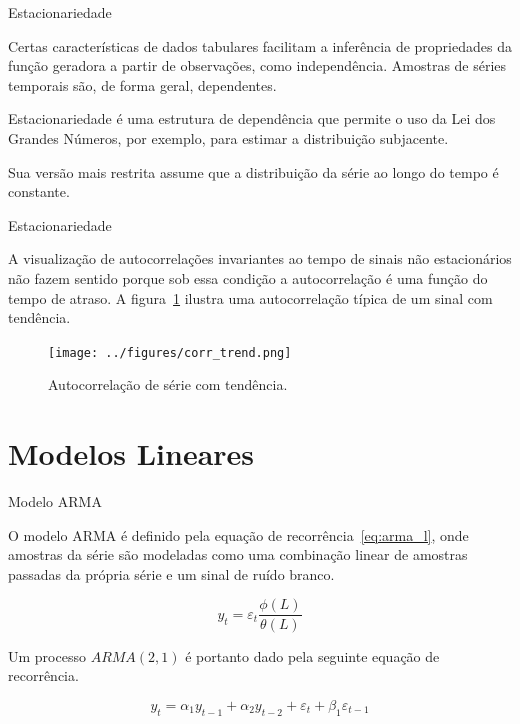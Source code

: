 \documentclass [xcolor=svgnames, t] {beamer}
\begin{document}
\begin{frame}{Estacionariedade}

Certas características de dados tabulares facilitam a inferência de
propriedades da função geradora a partir de observações, como
independência. Amostras de séries temporais são, de forma geral, dependentes.

\vspace{.5cm}

Estacionariedade é uma estrutura de dependência que permite o uso da Lei dos
Grandes Números, por exemplo, para estimar a distribuição subjacente.

\vspace{.5cm}

Sua versão mais restrita assume que a distribuição da série ao longo do tempo
é constante.


\end{frame}

\begin{frame}{Estacionariedade}

A visualização de autocorrelações invariantes ao tempo de sinais não
estacionários não fazem sentido porque sob essa condição a autocorrelação
é uma função do tempo de atraso. A figura~\ref{fig:trend_acorr} ilustra uma
autocorrelação típica de um sinal com tendência.

\begin{figure}[H]
    \centering
    \texttt{[image: ../figures/corr\_trend.png]}
    \caption{Autocorrelação de série com tendência.}
    \label{fig:trend_acorr}
\end{figure}

\end{frame}

\section{Modelos Lineares}

\begin{frame}{Modelo ARMA}

O modelo ARMA é definido pela equação de recorrência~\ref{eq:arma_l}, onde
amostras da série são modeladas como uma combinação linear de amostras
passadas da própria série e um sinal de ruído branco.

\vspace{0.5cm}

\begin{equation}\label{eq:arma_l}
    y_t = \varepsilon_t \frac{\phi(L)}{\theta(L)}
\end{equation}

\vspace{0.5cm}

Um processo $ARMA(2, 1)$ é portanto dado pela seguinte equação de recorrência.

$$ y_t = \alpha_1 y_{t-1} + \alpha_2 y_{t-2} + \varepsilon_{t} + \beta_1 \varepsilon_{t-1} $$

\end{frame}
\end{document}

